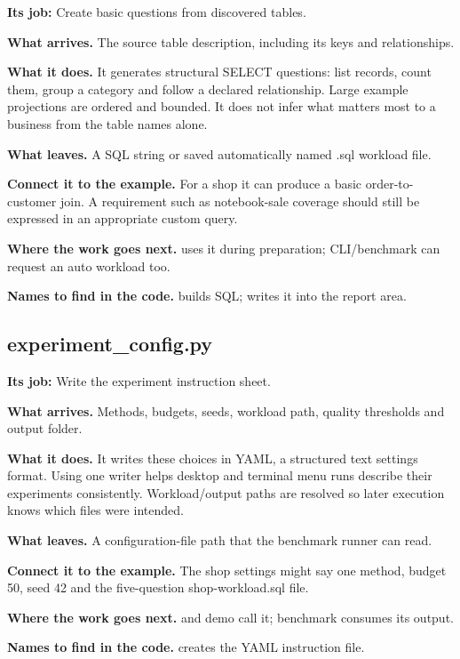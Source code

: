 \textbf{Its job:} Create basic questions from discovered tables.

\textbf{What arrives.} The source table description, including its keys and relationships.

\textbf{What it does.} It generates structural SELECT questions: list records, count them, group a category and follow a declared relationship. Large example projections are ordered and bounded. It does not infer what matters most to a business from the table names alone.

\textbf{What leaves.} A SQL string or saved automatically named .sql workload file.

\textbf{Connect it to the example.} For a shop it can produce a basic order-to-customer join. A requirement such as notebook-sale coverage should still be expressed in an appropriate custom query.

\textbf{Where the work goes next.}  uses it during preparation; CLI/benchmark can request an auto workload too.

\textbf{Names to find in the code.}  builds SQL;  writes it into the report area.


\subsection{experiment\_config.py}

\textbf{Its job:} Write the experiment instruction sheet.

\textbf{What arrives.} Methods, budgets, seeds, workload path, quality thresholds and output folder.

\textbf{What it does.} It writes these choices in YAML, a structured text settings format. Using one writer helps desktop and terminal menu runs describe their experiments consistently. Workload/output paths are resolved so later execution knows which files were intended.

\textbf{What leaves.} A configuration-file path that the benchmark runner can read.

\textbf{Connect it to the example.} The shop settings might say one method, budget 50, seed 42 and the five-question shop-workload.sql file.

\textbf{Where the work goes next.}  and demo call it; benchmark consumes its output.

\textbf{Names to find in the code.}  creates the YAML instruction file.

